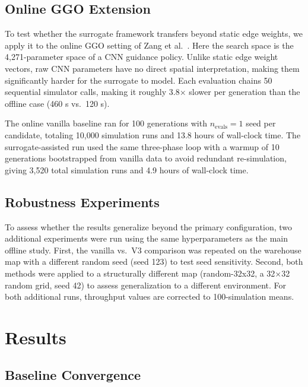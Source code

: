 \documentclass[conference]{IEEEtran}
\begin{document}
\subsection{Online GGO Extension}
\label{sec:online_setup}

To test whether the surrogate framework transfers beyond static edge
weights, we apply it to the online GGO setting of Zang et
al.~\cite{zang2025}. Here the search space is the 4,271-parameter space
of a CNN guidance policy. Unlike static edge weight vectors, raw CNN
parameters have no direct spatial interpretation, making them
significantly harder for the surrogate to model. Each evaluation chains
50 sequential simulator calls, making it roughly 3.8$\times$ slower per
generation than the offline case (460 s vs.\ 120 s).

The online vanilla baseline ran for 100 generations with $n_\text{evals} =
1$ seed per candidate, totaling 10,000 simulation runs and 13.8 hours of
wall-clock time. The surrogate-assisted run used the same three-phase loop
with a warmup of 10 generations bootstrapped from vanilla data to avoid
redundant re-simulation, giving 3,520 total simulation runs and 4.9 hours
of wall-clock time.


\subsection{Robustness Experiments}
\label{sec:robustness_setup}

To assess whether the results generalize beyond the primary configuration,
two additional experiments were run using the same hyperparameters as the
main offline study. First, the vanilla vs.\ V3 comparison was repeated on
the warehouse map with a different random seed (seed 123) to test seed
sensitivity. Second, both methods were applied to a structurally different
map (random-32x32, a 32$\times$32 random grid, seed 42) to assess
generalization to a different environment. For both additional runs,
throughput values are corrected to 100-simulation means.


\section{Results}
\label{sec:results}

\subsection{Baseline Convergence}
\end{document}
